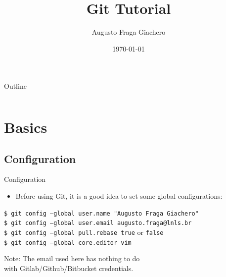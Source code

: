 \documentclass{beamer}
\title{Git Tutorial}
\author{Augusto Fraga Giachero}
\date{\today}
\begin{document}
\begin{frame}
  \titlepage
\end{frame}

\begin{frame}{Outline}
  \begin{columns}
    \begin{column}[T]{0.5\textwidth}
      \tableofcontents[sections=1]
    \end{column}
    \begin{column}[T]{0.5\textwidth}
      \tableofcontents[sections=2]
    \end{column}
  \end{columns}
\end{frame}

\section{Basics}

\subsection{Configuration}
\begin{frame}{Configuration}
  \begin{itemize}
    \item Before using Git, it is a good idea to set some global configurations:
  \end{itemize}
  \begin{block}{}
    \texttt{\$ git config --global user.name "Augusto Fraga Giachero"} \\
    \texttt{\$ git config --global user.email augusto.fraga@lnls.br} \\
    \texttt{\$ git config --global pull.rebase true} or \texttt{false} \\
    \texttt{\$ git config --global core.editor vim}
  \end{block}
  \begin{flushright}
    Note: The email used here has nothing to do \\ with Gitlab/Github/Bitbucket credentials.
  \end{flushright}
\end{frame}
\end{document}
